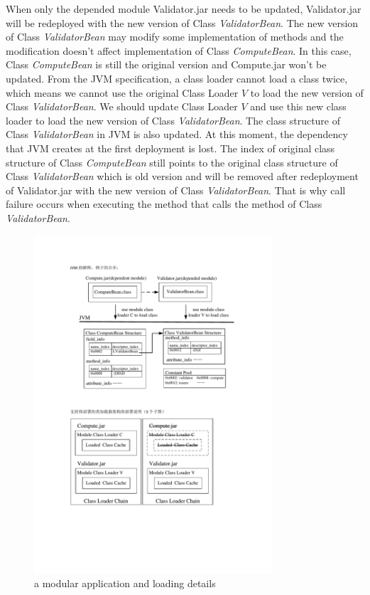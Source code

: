 \documentclass[conference]{IEEEtran}
\begin{document}
When only the depended module Validator.jar needs to be updated, Validator.jar will be redeployed with the new version of Class \emph{ValidatorBean}. 
The new version of Class \emph{ValidatorBean} may modify some implementation of methods and the modification doesn’t affect implementation of Class \emph{ComputeBean}. 
In this case, Class \emph{ComputeBean} is still the original version and Compute.jar won’t be updated. 
From the JVM specification\cite{jvm_specification}, a class loader cannot load a class twice, which means we cannot use the original Class Loader $V$ to load the new version of Class \emph{ValidatorBean}. 
We should update Class Loader $V$ and use this new class loader to load the new version of Class \emph{ValidatorBean}. 
The class structure of Class \emph{ValidatorBean} in JVM is also updated. 
At this moment, the dependency that JVM creates at the first deployment is lost. 
The index of original class structure of Class \emph{ComputeBean} still points to the original class structure of Class \emph{ValidatorBean} which is old version and will be removed after redeployment of Validator.jar with the new version of Class \emph{ValidatorBean}. 
That is why call failure occurs when executing the method that calls the method of Class \emph{ValidatorBean}.

\begin{figure}[ht]
\centering
\includegraphics[width=3.5in]{ExampleJVM.pdf}
\caption{a modular application and loading details}
\label{fig:example_jvm}
\end{figure}
\end{document}
